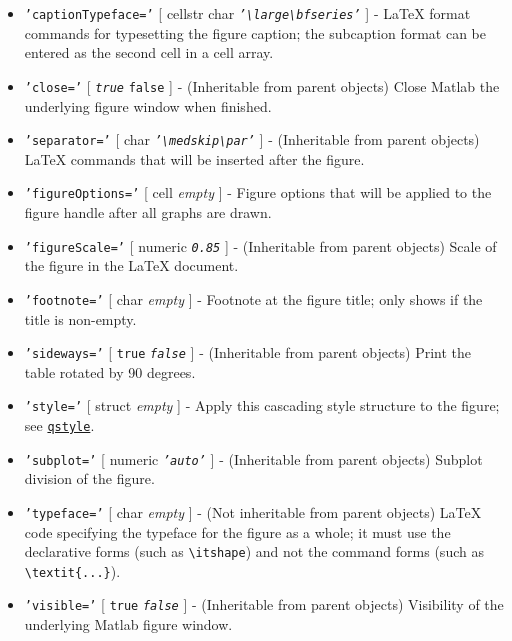  \begin{itemize}
 \item
   \texttt{'captionTypeface='} {[} cellstr \textbar{} char \textbar{}
   \emph{\texttt{'\textbackslash{}large\textbackslash{}bfseries'}} {]} -
   LaTeX format commands for typesetting the figure caption; the
   subcaption format can be entered as the second cell in a cell array.
 \item
   \texttt{'close='} {[} \emph{\texttt{true}} \textbar{} \texttt{false}
   {]} - (Inheritable from parent objects) Close Matlab the underlying
   figure window when finished.
 \item
   \texttt{'separator='} {[} char \textbar{}
   \emph{\texttt{'\textbackslash{}medskip\textbackslash{}par'}} {]} -
   (Inheritable from parent objects) LaTeX commands that will be inserted
   after the figure.
 \item
   \texttt{'figureOptions='} {[} cell \textbar{} \emph{empty} {]} -
   Figure options that will be applied to the figure handle after all
   graphs are drawn.
 \item
   \texttt{'figureScale='} {[} numeric \textbar{} \emph{\texttt{0.85}}
   {]} - (Inheritable from parent objects) Scale of the figure in the
   LaTeX document.
 \item
   \texttt{'footnote='} {[} char \textbar{} \emph{empty} {]} - Footnote
   at the figure title; only shows if the title is non-empty.
 \item
   \texttt{'sideways='} {[} \texttt{true} \textbar{}
   \emph{\texttt{false}} {]} - (Inheritable from parent objects) Print
   the table rotated by 90 degrees.
 \item
   \texttt{'style='} {[} struct \textbar{} \emph{empty} {]} - Apply this
   cascading style structure to the figure; see
   \href{qreport/qstyle}{\texttt{qstyle}}.
 \item
   \texttt{'subplot='} {[} numeric \textbar{} \emph{\texttt{'auto'}} {]}
   - (Inheritable from parent objects) Subplot division of the figure.
 \item
   \texttt{'typeface='} {[} char \textbar{} \emph{empty} {]} - (Not
   inheritable from parent objects) LaTeX code specifying the typeface
   for the figure as a whole; it must use the declarative forms (such as
   \texttt{\textbackslash{}itshape}) and not the command forms (such as
   \texttt{\textbackslash{}textit\{...\}}).
 \item
   \texttt{'visible='} {[} \texttt{true} \textbar{} \emph{\texttt{false}}
   {]} - (Inheritable from parent objects) Visibility of the underlying
   Matlab figure window.
 \end{itemize}
 
